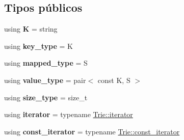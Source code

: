 \subsection*{Tipos públicos}
\begin{DoxyCompactItemize}
\item 
\hypertarget{classTrie_ae78bf68a4e51b38ce8ecd614bfcf9c24}{using {\bfseries K} = string}\label{classTrie_ae78bf68a4e51b38ce8ecd614bfcf9c24}

\item 
\hypertarget{classTrie_a721da5ee301497d84f2c1ec25b41a615}{using {\bfseries key\-\_\-type} = K}\label{classTrie_a721da5ee301497d84f2c1ec25b41a615}

\item 
\hypertarget{classTrie_a5d269bf4e543df76f997c52ac4b15189}{using {\bfseries mapped\-\_\-type} = S}\label{classTrie_a5d269bf4e543df76f997c52ac4b15189}

\item 
\hypertarget{classTrie_a8ba1bae33ef6bf522eb018dad765b8a3}{using {\bfseries value\-\_\-type} = pair$<$ const K, S $>$}\label{classTrie_a8ba1bae33ef6bf522eb018dad765b8a3}

\item 
\hypertarget{classTrie_a81d6e7abc535542d9a1550fbb284c617}{using {\bfseries size\-\_\-type} = size\-\_\-t}\label{classTrie_a81d6e7abc535542d9a1550fbb284c617}

\item 
\hypertarget{classTrie_ae46e816425def34615334b51b49e69f6}{using {\bfseries iterator} = typename \hyperlink{classTrie_1_1iterator}{Trie\-::iterator}}\label{classTrie_ae46e816425def34615334b51b49e69f6}

\item 
\hypertarget{classTrie_a0be15185f3a536976e20da62e9e57ea6}{using {\bfseries const\-\_\-iterator} = typename \hyperlink{classTrie_1_1const__iterator}{Trie\-::const\-\_\-iterator}}\label{classTrie_a0be15185f3a536976e20da62e9e57ea6}

\end{DoxyCompactItemize}
